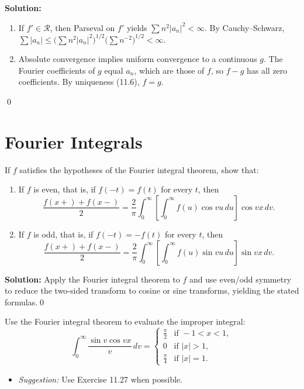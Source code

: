 \noindent\textbf{Solution:}
\begin{enumerate}[label=(\alph*)]
\item If $f'\in\mathcal R$, then Parseval on $f'$ yields $\sum n^2|a_n|^2<\infty$. By Cauchy–Schwarz, $\sum |a_n|\le\big(\sum n^2|a_n|^2\big)^{1/2}\big(\sum n^{-2}\big)^{1/2}<\infty$.
\item Absolute convergence implies uniform convergence to a continuous $g$. The Fourier coefficients of $g$ equal $a_n$, which are those of $f$, so $f-g$ has all zero coefficients. By uniqueness (11.6), $f=g$.
\end{enumerate}\qed
\section{Fourier Integrals}



\begin{problembox}
If $f$ satisfies the hypotheses of the Fourier integral theorem, show that:
\begin{enumerate}[label=(\alph*)]
\item If $f$ is even, that is, if $f(-t) = f(t)$ for every $t$, then
\[
\frac{f(x+) + f(x-)}{2} = \frac{2}{\pi} \int_0^\infty \left[ \int_0^\infty f(u) \cos vu \, du \right] \cos vx \, dv.
\]
\item If $f$ is odd, that is, if $f(-t) = -f(t)$ for every $t$, then
\[
\frac{f(x+) + f(x-)}{2} = \frac{2}{\pi} \int_0^\infty \left[ \int_0^\infty f(u) \sin vu \, du \right] \sin vx \, dv.
\]
\end{enumerate}
\end{problembox}

\noindent\textbf{Solution:}
Apply the Fourier integral theorem to $f$ and use even/odd symmetry to reduce the two-sided transform to cosine or sine transforms, yielding the stated formulas.\qed


\begin{problembox}
Use the Fourier integral theorem to evaluate the improper integral:
\[
\int_0^\infty \frac{\sin v \cos vx}{v} \, dv = 
\begin{cases} 
\frac{\pi}{2} & \text{if } -1 < x < 1, \\
0 & \text{if } |x| > 1, \\
\frac{\pi}{4} & \text{if } |x| = 1.
\end{cases}
\]
\begin{itemize}
\item \textit{Suggestion:} Use Exercise 11.27 when possible.
\end{itemize}
\end{problembox}


